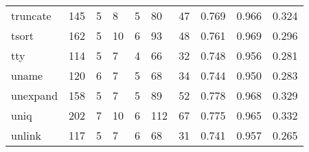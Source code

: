 \begin{longtable}{lp{1.3cm}p{1.3cm}p{1.3cm}p{1.3cm}p{1.3cm}p{1.3cm}p{1.3cm}p{1.3cm}p{1.3cm}}
truncate  &                    145 &                                  5 &                                 8 &                                5 &                                80 &                              47 &                                   0.769 &                                  0.966 &                                0.324 \\
tsort     &                    162 &                                  5 &                                10 &                                6 &                                93 &                              48 &                                   0.761 &                                  0.969 &                                0.296 \\
tty       &                    114 &                                  5 &                                 7 &                                4 &                                66 &                              32 &                                   0.748 &                                  0.956 &                                0.281 \\
uname     &                    120 &                                  6 &                                 7 &                                5 &                                68 &                              34 &                                   0.744 &                                  0.950 &                                0.283 \\
unexpand  &                    158 &                                  5 &                                 7 &                                5 &                                89 &                              52 &                                   0.778 &                                  0.968 &                                0.329 \\
uniq      &                    202 &                                  7 &                                10 &                                6 &                               112 &                              67 &                                   0.775 &                                  0.965 &                                0.332 \\
unlink    &                    117 &                                  5 &                                 7 &                                6 &                                68 &                              31 &                                   0.741 &                                  0.957 &                                0.265 \\

\end{longtable}
